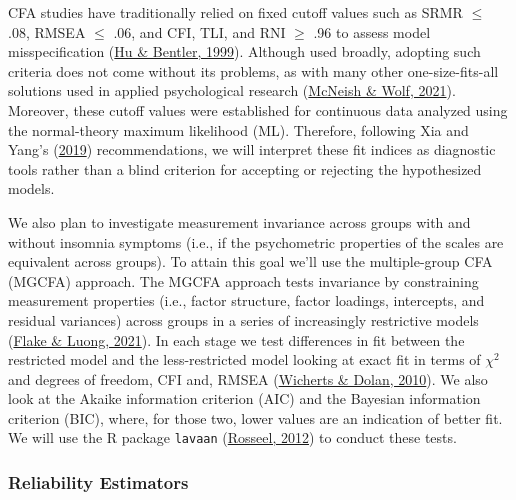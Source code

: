 \documentclass[
  ,doc,11pt, twoside,floatsintext]{apa6}
\begin{document}
CFA studies have traditionally relied on fixed cutoff values such as SRMR \(\le\) .08, RMSEA \(\le\) .06, and CFI, TLI, and RNI \(\ge\) .96 to assess model misspecification (\protect\hyperlink{ref-hu1999}{Hu \& Bentler, 1999}). Although used broadly, adopting such criteria does not come without its problems, as with many other one-size-fits-all solutions used in applied psychological research (\protect\hyperlink{ref-mcneish2021}{McNeish \& Wolf, 2021}). Moreover, these cutoff values were established for continuous data analyzed using the normal-theory maximum likelihood (ML). Therefore, following Xia and Yang's (\protect\hyperlink{ref-xia2019}{2019}) recommendations, we will interpret these fit indices as diagnostic tools rather than a blind criterion for accepting or rejecting the hypothesized models.

We also plan to investigate measurement invariance across groups with and without insomnia symptoms (i.e., if the psychometric properties of the scales are equivalent across groups). To attain this goal we'll use the multiple-group CFA (MGCFA) approach. The MGCFA approach tests invariance by constraining measurement properties (i.e., factor structure, factor loadings, intercepts, and residual variances) across groups in a series of increasingly restrictive models (\protect\hyperlink{ref-flake2021}{Flake \& Luong, 2021}). In each stage we test differences in fit between the restricted model and the less-restricted model looking at exact fit in terms of \(\chi^2\) and degrees of freedom, CFI and, RMSEA (\protect\hyperlink{ref-wicherts2010}{Wicherts \& Dolan, 2010}). We also look at the Akaike information criterion (AIC) and the Bayesian information criterion (BIC), where, for those two, lower values are an indication of better fit. We will use the R package \texttt{lavaan} (\protect\hyperlink{ref-lavaan}{Rosseel, 2012}) to conduct these tests.

\hypertarget{reliability-estimators}{%
\subsubsection{Reliability Estimators}\label{reliability-estimators}}
\end{document}
